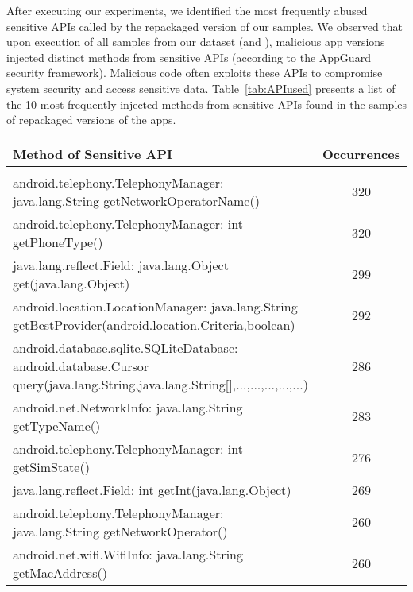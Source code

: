 After executing our experiments, we identified the  most frequently abused sensitive APIs called by the repackaged version of our samples.
We observed that upon execution of all samples from our dataset (\sds and \cds), malicious app versions injected  distinct methods from sensitive APIs (according to the
AppGuard~\cite{DBLP:conf/esorics/BackesGHMS13} security framework).
Malicious code often exploits these APIs to compromise system security and access sensitive data. Table~\ref{tab:APIused}
presents a list of the 10 most frequently injected methods from sensitive APIs found in the
\cds samples of repackaged versions of the apps.

\begin{table*}[ht]
  \caption{Sensitive APIs that frequently appear in the repackaged versions of the apps. The
    \emph{Occurrences} column gives the number of distinct repackaged apps that introduce a call
  to a sensitive method.}
\centering
  \begin{tabular}{lc}

    \hline
    Method of Sensitive API & Occurrences \\
    \hline \\
    android.telephony.TelephonyManager: java.lang.String getNetworkOperatorName() &  320\\
    android.telephony.TelephonyManager: int getPhoneType() &  320 \\
    java.lang.reflect.Field: java.lang.Object get(java.lang.Object) &  299 \\
    android.location.LocationManager: java.lang.String getBestProvider(android.location.Criteria,boolean) &  292 \\
    android.database.sqlite.SQLiteDatabase: android.database.Cursor query(java.lang.String,java.lang.String[],...,...,...,...,...) &  286 \\
    android.net.NetworkInfo: java.lang.String getTypeName() &  283\\
    android.telephony.TelephonyManager: int getSimState() &	276\\
    java.lang.reflect.Field: int getInt(java.lang.Object) &  269\\
    
    android.telephony.TelephonyManager: java.lang.String getNetworkOperator() &  260\\
    android.net.wifi.WifiInfo: java.lang.String getMacAddress()	& 260


    
\\\hline
\end{tabular}
\label{tab:APIused}
\end{table*}

